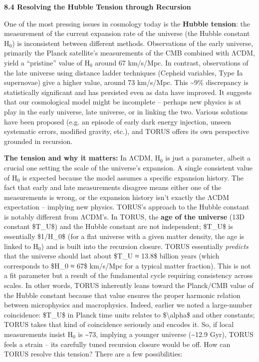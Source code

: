 \documentclass[]{article}
\newcommand{\subscript}[1]{\ensuremath{_{\mathrm{#1}}}}
\begin{document}
\textbf{8.4 Resolving the Hubble Tension through Recursion}

One of the most pressing issues in cosmology today is the \textbf{Hubble
tension}: the measurement of the current expansion rate of the universe
(the Hubble constant
H\subscript{0}) is
inconsistent between different methods. Observations of the early
universe, primarily the Planck satellite's measurements of the CMB
combined with ΛCDM, yield a ``pristine'' value of
H\subscript{0} around 67
km/s/Mpc. In contrast, observations of the late universe using distance
ladder techniques (Cepheid variables, Type Ia supernovae) give a higher
value, around 73 km/s/Mpc. This \textasciitilde{}9\% discrepancy is
statistically significant and has persisted even as data have improved.
It suggests that our cosmological model might be incomplete -- perhaps
new physics is at play in the early universe, late universe, or in
linking the two. Various solutions have been proposed (e.g. an episode
of early dark energy injection, unseen systematic errors, modified
gravity, etc.), and TORUS offers its own perspective grounded in
recursion.

\textbf{The tension and why it matters:} In ΛCDM,
H\subscript{0} is just a
parameter, albeit a crucial one setting the scale of the universe's
expansion. A single consistent value of
H\subscript{0} is expected
because the model assumes a specific expansion history. The fact that
early and late measurements disagree means either one of the
measurements is wrong, or the expansion history isn't exactly the ΛCDM
expectation -- implying new physics. TORUS's approach to the Hubble
constant is notably different from ΛCDM's. In TORUS, the \textbf{age of
the universe} (13D constant \$T\_U\$) and the Hubble constant are not
independent; \$T\_U\$ is essentially \$1/H\_0\$ (for a flat universe
with a given matter density, the age is linked to
H\subscript{0}) and is
built into the recursion closure. TORUS essentially \emph{predicts} that
the universe should last about \$T\_U ≈ 13.8\$ billion years (which
corresponds to \$H\_0 ≈ 67\$ km/s/Mpc for a typical matter fraction)​.
This is not a fit parameter but a result of the fundamental cycle
requiring consistency across scales. In other words, TORUS inherently
leans toward the Planck/CMB value of the Hubble constant because that
value ensures the proper harmonic relation between microphysics and
macrophysics. Indeed, earlier we noted a large-number coincidence:
\$T\_U\$ in Planck time units relates to \$\textbackslash{}alpha\$ and
other constants; TORUS takes that kind of coincidence seriously and
encodes it. So, if local measurements insist
H\subscript{0} is
\textasciitilde{}73, implying a younger universe (\textasciitilde{}12.9
Gyr), TORUS feels a strain -- its carefully tuned recursion closure
would be off​. How can TORUS resolve this tension? There are a few
possibilities:
\end{document}
